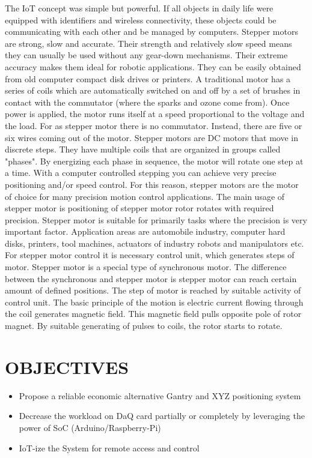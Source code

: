 \documentclass[MTech]{iitmdiss}
\begin{document}
The IoT concept was simple but powerful. If all objects in daily life were equipped with identifiers and wireless connectivity, these objects could be communicating with each other and be managed by computers. Stepper motors are strong, slow and accurate. Their strength and relatively slow speed means they can usually be used without any gear-down mechanisms. Their extreme accuracy makes them ideal for robotic applications. They can be easily obtained from old computer compact disk drives or printers. A traditional motor has a series of coils which are automatically switched on and off by a set of brushes in contact with the commutator (where the sparks and ozone come from). Once power is applied, the motor runs itself at a speed proportional to the voltage and the load. For as stepper motor there is no commutator. Instead, there are five or six wires coming out of the motor. Stepper motors are DC motors that move in discrete steps. They have multiple coils that are organized in groups called "phases". By energizing each phase in sequence, the motor will rotate one step at a time. With a computer controlled stepping you can achieve very precise positioning and/or speed control. For this reason, stepper motors are the motor of choice for many precision motion control applications. The main usage of stepper motor is positioning of stepper motor rotor rotates with required precision. Stepper motor is suitable for primarily tasks where the precision is very important factor. Application areas are automobile industry, computer hard disks, printers, tool machines, actuators of industry robots and manipulators etc. For stepper motor control it is necessary control unit, which generates steps of motor. Stepper motor is a special type of synchronous motor. The difference between the synchronous and stepper motor is stepper motor can reach certain amount of defined positions. The step of motor is reached by suitable activity of control unit. The basic principle of the motion is electric current flowing through the coil generates magnetic field. This magnetic field pulls opposite pole of rotor magnet. By suitable generating of pulses to coils, the rotor starts to rotate.


\section{OBJECTIVES}

\begin{itemize}
\item Propose a reliable economic alternative Gantry and XYZ positioning system
\item Decrease the workload on DaQ card partially or completely by leveraging the power of SoC (Arduino/Raspberry-Pi)
\item IoT-ize the System for remote access and control

\end{itemize}
\end{document}
